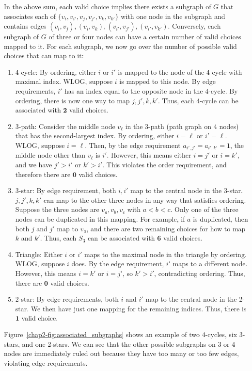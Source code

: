 {In the above sum, each valid choice implies there exists
a subgraph of $G$ that associates
each of $\{v_i, v_{i'}, v_j, v_{j'}, v_k, v_{k'}\}$ with one node in the subgraph and contains edges $(v_i, v_j), (v_i, v_k), (v_{i'}, v_{j'}), (v_{i'}, v_{k'})$.
Conversely,
each
subgraph of $G$ of three or four nodes can have a certain
number of valid choices mapped to it. For each
subgraph, we now go over the number of possible valid choices that can map to it:

\begin{enumerate}
    \item 4-cycle: By ordering, either $i$ or $i'$ is mapped to the node of the 4-cycle
    with maximal
    index. WLOG, suppose $i$ is mapped to this node. By edge requirements, $i'$ has an index equal
    to the opposite node in the $4$-cycle. By ordering, there is now one
    way to map $j,j',k,k'$. Thus, each 4-cycle can be associated with
    $\mathbf{2}$ valid choices.
    \item 3-path: Consider the middle node $v_\ell$ in the 3-path (path graph on 4 nodes) that has
    the second-largest index.
    By ordering, either $i=\ell$ or $i' = \ell$.
    WLOG, suppose $i = \ell$. Then, by the edge requirement $a_{i',j'} = a_{i', k'} = 1$, the middle node other than $v_\ell$ is
    $i'$. However, this means either $i = j'$ or $i = k'$, and we have $j' > i'$ or $k' > i'$.
    This violates the order requirement, and therefore there are $\textbf{0}$ valid choices.
    \item 3-star: By edge requirement, both $i,i'$ map to the central node in the 3-star.
    $j,j',k,k'$ can map to the other three nodes in any way that satisfies ordering.
    Suppose the three nodes are $v_{a}, v_{b}, v_c$ with $a < b < c$.
    Only one of
    the three nodes can be duplicated in this mapping.
    For example, if
    $a$ is duplicated, then both
    $j$ and $j'$
    map to $v_a$, and there are two remaining choices
    for how to map
    $k$ and $k'$.
    Thus,
    each $S_3$ can
    be associated with
    $\mathbf{6}$ valid choices.
    \item Triangle: Either $i$ or $i'$ maps to the maximal node in the triangle
    by ordering. WLOG, suppose $i$ does. By the edge requirement, $i'$ maps
    to a different node. However, this means $i = k'$ or $i=j'$, so $k' > i'$,
    contradicting ordering. Thus, there are $\textbf{0}$ valid choices.
    \item 2-star: By edge requirements, both $i$ and $i'$ map to the central node in the
    2-star. We then have just one mapping for the remaining indices. Thus, there
    is $\textbf{1}$ valid choice.
\end{enumerate}
Figure~\ref{chap2-fig:associated_subgraphs} shows an example of two 4-cycles, six 3-stars, and one 2-stars.
We can see that the other possible subgraphs on 3 or 4 nodes are immediately
ruled out because they have too many or too few edges, violating edge requirements.

}
